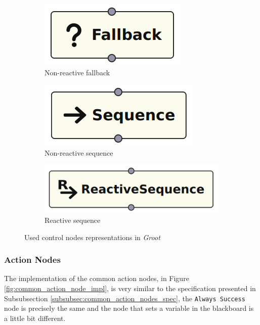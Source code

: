 \begin{figure}[!h]
    \centering
    \begin{subfigure}[b]{.32\linewidth}
        \centering
        \includegraphics[width=0.52\linewidth]{chapters/development/images/FallbackNode.png}
        \caption{Non-reactive fallback}
    \end{subfigure}
    \hfill
    \begin{subfigure}[b]{.32\linewidth}
        \centering
        \includegraphics[width=0.57\linewidth]{chapters/development/images/SequenceNode.png}
        \caption{Non-reactive sequence}
    \end{subfigure}
    \hfill
    \begin{subfigure}[b]{.32\linewidth}
        \centering
        \includegraphics[width=0.8\linewidth]{chapters/development/images/ReactiveSequenceNode.png}
        \caption{Reactive sequence}
    \end{subfigure}
    \caption{Used control nodes representations in \textit{Groot}}
    \label{fig:control_nodes_impl}
\end{figure}

\subsubsection{Action Nodes}

The implementation of the common action nodes, in Figure \ref{fig:common_action_node_impl}, is very similar to the specification presented in Subsubsection \ref{subsubsec:common_action_nodes_spec}, the \texttt{Always Success} node is precisely the same and the node that sets a variable in the blackboard is a little bit different. 

